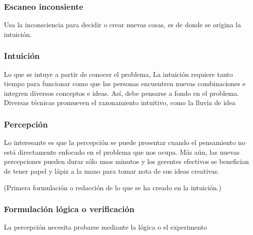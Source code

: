 \documentclass{article}
\begin{document}
%
\subsubsection{Escaneo inconsiente}
Usa la inconsciencia para decidir o crear nuevas cosas, es de donde se origina la intuición.

%
\subsubsection{Intuición}
Lo que se intuye a partir de conocer el problema, La intuición requiere tanto tiempo para funcionar como que las personas encuentren nuevas combinaciones e integren diversos conceptos e ideas. Así, debe pensarse a fondo en el problema. Diversas técnicas promueven el razonamiento intuitivo, como la lluvia de idea

%
\subsubsection{Percepción}
Lo interesante es que la percepción se puede presentar cuando el pensamiento no está directamente enfocado en el problema que nos ocupa. Más aún, las nuevas percepciones pueden durar sólo unos minutos y los gerentes efectivos se benefician de tener papel y lápiz a la mano para tomar nota de sus ideas creativas.

(Primera formulación o redacción de lo que se ha creado en la intuición.)

%
\subsubsection{Formulación lógica o verificación}
La percepción necesita probarse mediante la lógica o el experimento


\end{document}
